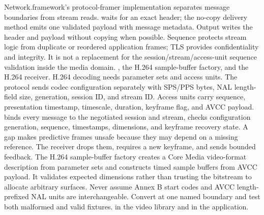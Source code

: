 {}Network.framework's protocol-framer implementation separates message boundaries from stream reads.  waits for an exact header; the no-copy delivery method emits one validated payload with message metadata. Output writes the header and payload without copying when possible.\markdownRendererParagraphSeparator
{}Sequence protects stream logic from duplicate or reordered application frames; TLS provides confidentiality and integrity. It is not a replacement for the session/stream/access-unit sequence validation inside the media domain.\markdownRendererInterblockSeparator
{}
\markdownRendererSectionEnd \markdownRendererSectionBegin
{}\markdownRendererInterblockSeparator
{}\markdownRendererBlockQuoteBegin
{} , the H.264 sample-buffer factory, and the H.264 receiver.\markdownRendererBlockQuoteEnd \markdownRendererInterblockSeparator
{}H.264 decoding needs parameter sets and access units. The protocol sends codec configuration separately with SPS/PPS bytes, NAL length-field size, generation, session ID, and stream ID. Access units carry sequence, presentation timestamp, timescale, duration, keyframe flag, and AVCC payload.\markdownRendererParagraphSeparator
{} binds every message to the negotiated session and stream, checks configuration generation, sequence, timestamps, dimensions, and keyframe recovery state. A gap makes predictive frames unsafe because they may depend on a missing reference. The receiver drops them, requires a new keyframe, and sends bounded feedback.\markdownRendererParagraphSeparator
{}The H.264 sample-buffer factory creates a Core Media video-format description from parameter sets and constructs timed sample buffers from AVCC payload. It validates expected dimensions rather than trusting the bitstream to allocate arbitrary surfaces.\markdownRendererParagraphSeparator
{}Never assume Annex B start codes and AVCC length-prefixed NAL units are interchangeable. Convert at one named boundary and test both malformed and valid fixtures.\markdownRendererInterblockSeparator
{}
\markdownRendererSectionEnd \markdownRendererSectionBegin
{}\markdownRendererInterblockSeparator
{}\markdownRendererBlockQuoteBegin
{}  in the video library and  in the application.\markdownRendererBlockQuoteEnd \markdownRendererInterblockSeparator
